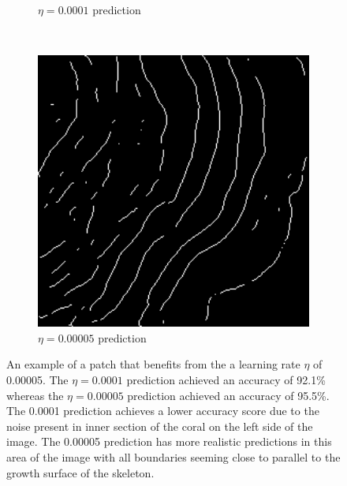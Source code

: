 \begin{figure}[!t]
\begin{subfigure}[t]{0.32\textwidth}
        \caption{$\eta=0.0001$ prediction}
    \end{subfigure}
    ~
    \begin{subfigure}[t]{0.32\textwidth}
        \centering
        \includegraphics[width=1\textwidth, valign=c]{images/5e5-example.png}
        \caption{$\eta=0.00005$ prediction}
    \end{subfigure}
    \caption{An example of a patch that benefits from the a learning rate $\eta$ of 0.00005. The $\eta=0.0001$ prediction achieved an accuracy of 92.1\% whereas the $\eta=0.00005$ prediction achieved an accuracy of 95.5\%. The 0.0001 prediction achieves a lower accuracy score due to the noise present in inner section of the coral on the left side of the image. The 0.00005 prediction has more realistic predictions in this area of the image with all boundaries seeming close to parallel to the growth surface of the skeleton.}
    \label{fig:lrdiff}
\end{figure}


